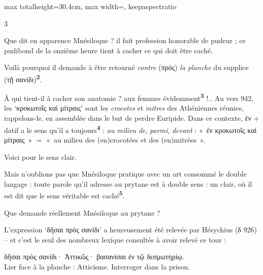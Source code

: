 \documentclass[11pt,twoside]{book}
\newcommand{\italique}[1]{\textit{#1}}
\newcommand{\citComm}[1]{\begin{quoting}[vskip=0.4pt,leftmargin=0.7em,rightmargin=0.2em]#1\end{quoting}}
\newcommand{\marqueur}[1]{\textsuperscript{\color{rubricRed}\textbf{#1}}}
\begin{document}
\begin{adjustbox}{max totalheight=30.4cm, max width=\textwidth, keepaspectratio}
\begin{minipage}{\textwidth}
{\begin{multicols}{3}
\par\vspace{1.5pt}
\noindent Que dit en apparence Mnésiloque ? il fait profession honorable de pudeur ; ce pudibond de la onzième heure tient à cacher ce qui doit être caché.
\par\vspace{1.5pt}
\noindent Voilà pourquoi il demande à être retourné \italique{contre} (πρός) \italique{la planche} du supplice (τῇ σανίδι)\marqueur{2}.
\par\vspace{1.5pt}
\noindent À qui tient-il à cacher son anatomie ? aux femmes évidemment\marqueur{3} !.. Au vers 942, les `κροκωτοῖς καὶ μίτραις' sont les \italique{crocotes} et \italique{mitres} des Athéniennes réunies, rappelons-le, en assemblée dans le but de perdre Euripide. Dans ce contexte, ἐν + datif a le sens qu'il a toujours\marqueur{4} : \italique{au milieu de}, \italique{parmi}, \italique{devant} : «~ἐν κροκωτοῖς καὶ μίτραις~» $=$ «~au milieu des (en)crocotées et des (en)mitrées~».
\par\vspace{1.5pt}
\noindent Voici pour le sens clair.
\par\vspace{1.5pt}
\noindent Mais n'oublions pas que Mnésiloque pratique avec un art consommé le double langage : toute parole qu'il adresse au prytane est à double sens : un clair, où il est dit que le sens véritable est caché\marqueur{5}.
\par\vspace{1.5pt}
\noindent Que demande réellement Mnésiloque au prytane ?
\par\vspace{1.5pt}
\noindent L'expression `δῆσαι πρὸς σανίδι' a heureusement été relevée par Hésychius (δ 926) -- et c'est le seul des nombreux lexique consultés à avoir relevé ce tour :
\citComm{δῆσαι πρὸς σανίδι· Ἀττικῶς· βασανίσαι ἐν τῷ δεσμωτηρίῳ.\\
Lier face à la planche : Atticisme. Interroger dans la prison.}
\par\end{multicols}}
\end{minipage}\end{adjustbox}
\newpage
\end{document}
